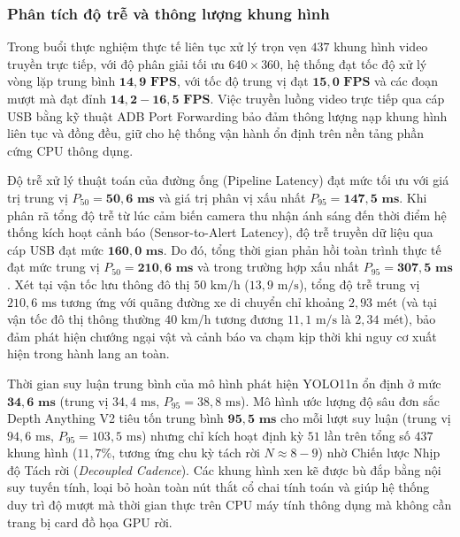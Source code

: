\documentclass[12pt,a4paper]{article}
\begin{document}
\subsubsection{Phân tích độ trễ và thông lượng khung hình}
Trong buổi thực nghiệm thực tế liên tục xử lý trọn vẹn $437$ khung hình video truyền trực tiếp, với độ phân giải tối ưu $640 \times 360$, hệ thống đạt tốc độ xử lý vòng lặp trung bình $\mathbf{14,9\text{ FPS}}$, với tốc độ trung vị đạt $\mathbf{15,0\text{ FPS}}$ và các đoạn mượt mà đạt đỉnh $\mathbf{14,2 - 16,5\text{ FPS}}$. Việc truyền luồng video trực tiếp qua cáp USB bằng kỹ thuật ADB Port Forwarding bảo đảm thông lượng nạp khung hình liên tục và đồng đều, giữ cho hệ thống vận hành ổn định trên nền tảng phần cứng CPU thông dụng.

Độ trễ xử lý thuật toán của đường ống (Pipeline Latency) đạt mức tối ưu với giá trị trung vị $P_{50} = \mathbf{50,6\text{ ms}}$ và giá trị phân vị xấu nhất $P_{95} = \mathbf{147,5\text{ ms}}$. Khi phân rã tổng độ trễ từ lúc cảm biến camera thu nhận ánh sáng đến thời điểm hệ thống kích hoạt cảnh báo (Sensor-to-Alert Latency), độ trễ truyền dữ liệu qua cáp USB đạt mức $\mathbf{160,0\text{ ms}}$. Do đó, tổng thời gian phản hồi toàn trình thực tế đạt mức trung vị $P_{50} = \mathbf{210,6\text{ ms}}$ và trong trường hợp xấu nhất $P_{95} = \mathbf{307,5\text{ ms}}$. Xét tại vận tốc lưu thông đô thị $50\text{ km/h}$ ($13,9\text{ m/s}$), tổng độ trễ trung vị $210,6\text{ ms}$ tương ứng với quãng đường xe di chuyển chỉ khoảng $2,93\text{ mét}$ (và tại vận tốc đô thị thông thường $40\text{ km/h}$ tương đương $11,1\text{ m/s}$ là $2,34\text{ mét}$), bảo đảm phát hiện chướng ngại vật và cảnh báo va chạm kịp thời khi nguy cơ xuất hiện trong hành lang an toàn.

Thời gian suy luận trung bình của mô hình phát hiện YOLO11n ổn định ở mức $\mathbf{34,6\text{ ms}}$ (trung vị $34,4\text{ ms}$, $P_{95} = 38,8\text{ ms}$). Mô hình ước lượng độ sâu đơn sắc Depth Anything V2 tiêu tốn trung bình $\mathbf{95,5\text{ ms}}$ cho mỗi lượt suy luận (trung vị $94,6\text{ ms}$, $P_{95} = 103,5\text{ ms}$) nhưng chỉ kích hoạt định kỳ $51$ lần trên tổng số $437$ khung hình ($11,7\%$, tương ứng chu kỳ tách rời $N \approx 8 - 9$) nhờ Chiến lược Nhịp độ Tách rời (\textit{Decoupled Cadence}). Các khung hình xen kẽ được bù đắp bằng nội suy tuyến tính, loại bỏ hoàn toàn nút thắt cổ chai tính toán và giúp hệ thống duy trì độ mượt mà thời gian thực trên CPU máy tính thông dụng mà không cần trang bị card đồ họa GPU rời.
\end{document}
